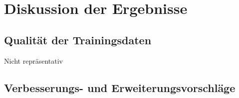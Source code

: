 \section{Diskussion der Ergebnisse}




\subsection{Qualität der Trainingsdaten}
Nicht repräsentativ

\subsection{Verbesserungs- und Erweiterungsvorschläge}